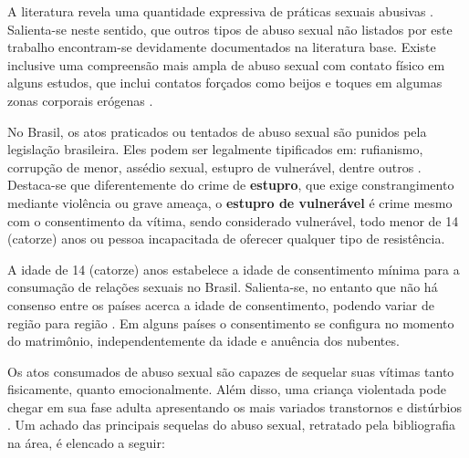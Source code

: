 \begin{parcolumns}[sloppy, distance=3em, colwidths={2=0.5\textwidth}]{2}
	\colplacechunks

\end{parcolumns}

\newpage

A literatura revela uma quantidade expressiva de práticas sexuais abusivas \cite{brasil2002notificacao, habigzang2005abuso, sayao2006refazendo, santos2011guia, ibiapina2013influencias, lima2013violencia, lima2015violencia, barros2016participaccao, brasil2018violencia}. Salienta-se neste sentido, que outros tipos de abuso sexual não listados por este trabalho encontram-se devidamente documentados na literatura base. Existe inclusive uma compreensão mais ampla de abuso sexual com contato físico em alguns estudos, que inclui contatos forçados como beijos e toques em algumas zonas corporais erógenas \cite{sayao2006refazendo, santos2009guia}.

No Brasil, os atos praticados ou tentados de abuso sexual são punidos pela legislação brasileira. Eles podem ser legalmente tipificados em: rufianismo, corrupção de menor, assédio sexual, estupro de vulnerável, dentre outros \cite{Lei:12015:2009}. Destaca-se que diferentemente do crime de \textbf{estupro}, que exige constrangimento mediante violência ou grave ameaça, o \textbf{estupro de vulnerável} é crime mesmo com o consentimento da vítima, sendo considerado vulnerável, todo menor de 14 (catorze) anos ou pessoa incapacitada de oferecer qualquer tipo de resistência. 

A idade de 14 (catorze) anos estabelece a idade de consentimento mínima para a consumação de relações sexuais no Brasil. Salienta-se, no entanto que não há consenso entre os países acerca a idade de consentimento, podendo variar de região para região \cite{waites2005age}. Em alguns países o consentimento se configura no momento do matrimônio, independentemente da idade e anuência dos nubentes. 

Os atos consumados de abuso sexual são capazes de sequelar suas vítimas tanto fisicamente, quanto emocionalmente. Além disso, uma criança violentada pode chegar em sua fase adulta apresentando os mais variados transtornos e distúrbios \cite{mariscal2003programa, OMS2017responding}. Um achado das principais sequelas do abuso sexual, retratado pela bibliografia na área, é elencado a seguir:

